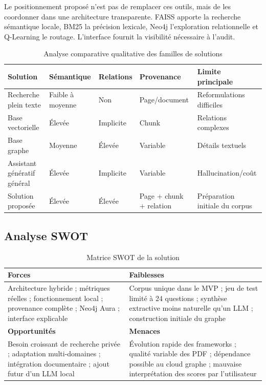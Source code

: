 \documentclass[12pt,a4paper,oneside]{report}
\begin{document}
Le positionnement proposé n'est pas de remplacer ces outils, mais de les coordonner dans une architecture transparente. FAISS apporte la recherche sémantique locale, BM25 la précision lexicale, Neo4j l'exploration relationnelle et Q-Learning le routage. L'interface fournit la visibilité nécessaire à l'audit.

\begin{table}[H]
\centering
\caption{Analyse comparative qualitative des familles de solutions}
\begin{tabularx}{\textwidth}{p{}XXXX}
\toprule
\textbf{Solution} & \textbf{Sémantique} & \textbf{Relations} & \textbf{Provenance} & \textbf{Limite principale}\\
\midrule
Recherche plein texte & Faible à moyenne & Non & Page/document & Reformulations difficiles\\
Base vectorielle & Élevée & Implicite & Chunk & Relations complexes\\
Base graphe & Moyenne & Élevée & Variable & Détails textuels\\
Assistant génératif général & Élevée & Implicite & Variable & Hallucination/coût\\
Solution proposée & Élevée & Élevée & Page + chunk + relation & Préparation initiale du corpus\\
\bottomrule
\end{tabularx}
\end{table}

\subsection{Analyse SWOT}
\begin{table}[H]
\centering
\caption{Matrice SWOT de la solution}
\begin{tabularx}{\textwidth}{|X|X|}
\hline
\textbf{Forces} & \textbf{Faiblesses}\\
\hline
Architecture hybride ; métriques réelles ; fonctionnement local ; provenance complète ; Neo4j Aura ; interface explicable & Corpus unique dans le MVP ; jeu de test limité à 24 questions ; synthèse extractive moins naturelle qu'un LLM ; construction initiale du graphe\\
\hline
\textbf{Opportunités} & \textbf{Menaces}\\
\hline
Besoin croissant de recherche privée ; adaptation multi-domaines ; intégration documentaire ; ajout futur d'un LLM local & Évolution rapide des frameworks ; qualité variable des PDF ; dépendance possible au cloud graphe ; mauvaise interprétation des scores par l'utilisateur\\
\hline
\end{tabularx}
\end{table}
\end{document}
